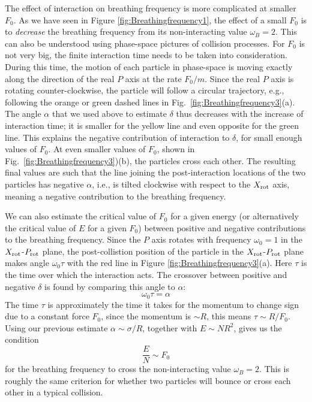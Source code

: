 \documentclass[onecolumn,pra]{revtex4-1}
\begin{document}
The effect of interaction on breathing frequency is more complicated at smaller $F_0$.  As we have
seen in Figure \ref{fig:Breathingfrequency1}, the effect of a small $F_0$ is to \emph{decrease} the
breathing frequency from its non-interacting value $\omega_B=2$.  This can also be understood using
phase-space pictures of collision processes.  For $F_0$ is not very big, the finite interaction time
needs to be taken into consideration.  During this time, the motion of each particle in phase-space
is moving exactly along the direction of the real $P$ axis at the rate $F_0/m$. Since the real $P$
axis is rotating counter-clockwise, the particle will follow a circular trajectory, e.g., following
the orange or green dashed lines in Fig.~\ref{fig:Breathingfrequency3}(a).  The angle $\alpha$ that
we used above to estimate $\delta$ thus decreases with the increase of interaction time; it is
smaller for the yellow line and even opposite for the green line.  This explains the negative
contribution of interaction to $\delta$, for small enough values of $F_0$.  At even smaller values
of $F_0$, shown in Fig.~\ref{fig:Breathingfrequency3})(b), the particles cross each other.  The
resulting final values are such that the line joining the post-interaction locations of the two
particles has negative $\alpha$, i.e., is tilted clockwise with respect to the $X_{\rm rot}$ axis,
meaning a negative contribution to the breathing frequency.

We can also estimate the critical value of $F_0$ for a given energy (or alternatively the critical
value of $E$ for a given $F_0$) between positive and negative contributions to the breathing
frequency.  Since the $P$ axis rotates with frequency $\omega_0=1$ in the $X_{\rm rot}$-$P_{\rm
  rot}$ plane, the post-collistion position of the particle in the $X_{\rm rot}$-$P_{\rm rot}$ plane
makes angle $\omega_0\tau$ with the red line in Figure \ref{fig:Breathingfrequency3}(a).  Here
$\tau$ is the time over which the interaction acts.  The crossover between positive and negative
$\delta$ is found by comparing this angle to $\alpha$:
\begin{equation}
\omega_0 \tau=\alpha
\end{equation}
The time $\tau$ is approximately the time it takes for the momentum to change sign due to a constant
force $F_0$, since the momentum is $\sim R$, this means $\tau\sim R/F_0$.  Using our previous
estimate  $\alpha\sim \sigma/R$, together with $E\sim NR^2$, gives us the condition
\begin{equation}
  \frac{E}{N} \sim F_0
  \label{eq_freq_turning_condition}
\end{equation}
for the breathing frequency to cross the non-interacting value $\omega_B=2$.  This is roughly the
same criterion for whether two particles will bounce or cross each other in a typical collision.
\end{document}
